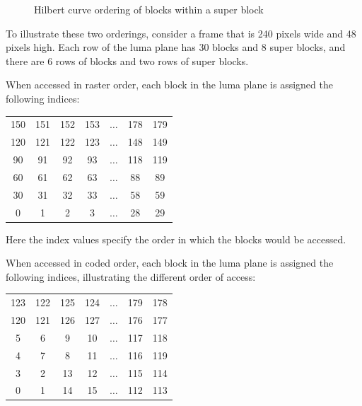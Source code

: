 \documentclass[11pt,letterpaper]{book}
\numberwithin{equation}{chapter}
\numberwithin{figure}{chapter}
\numberwithin{table}{chapter}
\begin{document}
\begin{figure}[htb]
\begin{center}

\end{center}
\caption{Hilbert curve ordering of blocks within a super block}
\label{fig:hilbert-block}
\end{figure}

To illustrate these two orderings, consider a frame that is 240 pixels wide and
 48 pixels high.
Each row of the luma plane has 30 blocks and 8 super blocks, and there are 6
 rows of blocks and two rows of super blocks.

When accessed in raster order, each block in the luma plane is assigned the
 following indices:

\vspace{\baselineskip}
\begin{center}
\begin{tabular}{|cccc|c|cc|}\hline
150 & 151 & 152 & 153 & $\ldots$ & 178 & 179 \\
120 & 121 & 122 & 123 & $\ldots$ & 148 & 149 \\\hline
 90 &  91 &  92 &  93 & $\ldots$ & 118 & 119 \\
 60 &  61 &  62 &  63 & $\ldots$ &  88 &  89 \\
 30 &  31 &  32 &  33 & $\ldots$ &  58 &  59 \\
  0 &   1 &   2 &   3 & $\ldots$ &  28 &  29 \\\hline
\end{tabular}
\end{center}
\vspace{\baselineskip}

Here the index values specify the order in which the blocks would be accessed.

When accessed in coded order, each block in the luma plane is assigned the
 following indices, illustrating the different order of access:

\vspace{\baselineskip}
\begin{center}
\begin{tabular}{|cccc|c|cc|}\hline
123 & 122 & 125 & 124 & $\ldots$ & 179 & 178 \\
120 & 121 & 126 & 127 & $\ldots$ & 176 & 177 \\\hline
  5 &   6 &   9 &  10 & $\ldots$ & 117 & 118 \\
  4 &   7 &   8 &  11 & $\ldots$ & 116 & 119 \\
  3 &   2 &  13 &  12 & $\ldots$ & 115 & 114 \\
  0 &   1 &  14 &  15 & $\ldots$ & 112 & 113 \\\hline
\end{tabular}
\end{center}
\vspace{\baselineskip}
\end{document}
